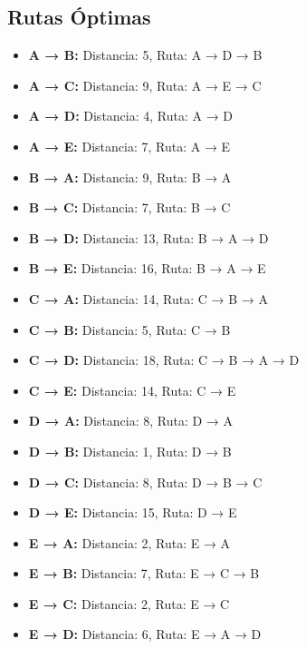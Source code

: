 \documentclass[12pt]{article}
\begin{document}
\subsection{Rutas Óptimas}
\begin{itemize}
\item \textbf{A → B:} Distancia: 5, Ruta: A → D → B
\item \textbf{A → C:} Distancia: 9, Ruta: A → E → C
\item \textbf{A → D:} Distancia: 4, Ruta: A → D
\item \textbf{A → E:} Distancia: 7, Ruta: A → E
\item \textbf{B → A:} Distancia: 9, Ruta: B → A
\item \textbf{B → C:} Distancia: 7, Ruta: B → C
\item \textbf{B → D:} Distancia: 13, Ruta: B → A → D
\item \textbf{B → E:} Distancia: 16, Ruta: B → A → E
\item \textbf{C → A:} Distancia: 14, Ruta: C → B → A
\item \textbf{C → B:} Distancia: 5, Ruta: C → B
\item \textbf{C → D:} Distancia: 18, Ruta: C → B → A → D
\item \textbf{C → E:} Distancia: 14, Ruta: C → E
\item \textbf{D → A:} Distancia: 8, Ruta: D → A
\item \textbf{D → B:} Distancia: 1, Ruta: D → B
\item \textbf{D → C:} Distancia: 8, Ruta: D → B → C
\item \textbf{D → E:} Distancia: 15, Ruta: D → E
\item \textbf{E → A:} Distancia: 2, Ruta: E → A
\item \textbf{E → B:} Distancia: 7, Ruta: E → C → B
\item \textbf{E → C:} Distancia: 2, Ruta: E → C
\item \textbf{E → D:} Distancia: 6, Ruta: E → A → D
\end{itemize}
\end{document}
